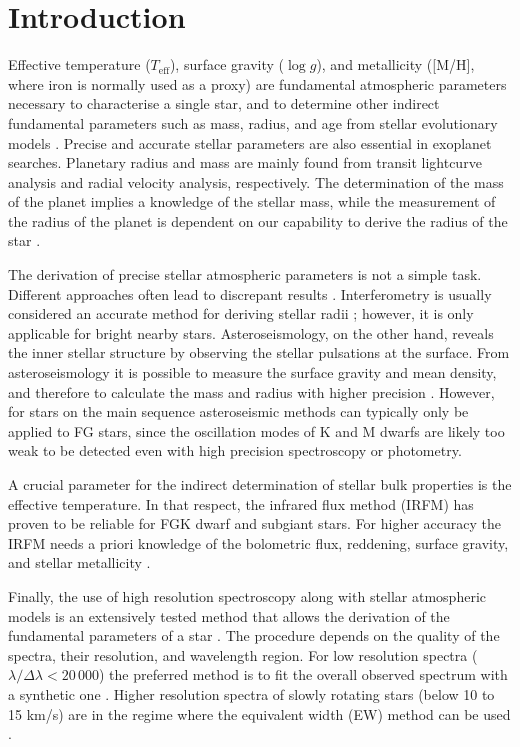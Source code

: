 \documentclass{aa}
\begin{document}
\section{Introduction}
\label{sec:introduction}

Effective temperature ($T_\mathrm{eff}$), surface gravity ($\log g$),
and metallicity ([M/H], where iron is normally used as a proxy)
are fundamental atmospheric parameters necessary to characterise a single
star, and to determine other indirect fundamental parameters
such as mass, radius, and age from stellar evolutionary models
\citep[see e.g.][]{Girardi2000,Dotter2008,Baraffe2015}.
Precise and accurate stellar parameters are also essential in
exoplanet searches. Planetary radius and mass are mainly found from
transit lightcurve analysis and radial velocity analysis, respectively. The
determination of the mass of the planet implies a knowledge of the
stellar mass, while the measurement of the radius of the planet
is dependent on our capability to derive the radius of the star
\citep[see e.g.][]{Torres2008,Ammler2009,Torres2012}.

The derivation of precise stellar atmospheric parameters is not a simple task.
Different approaches often lead to discrepant results
\citep[see e.g.][]{Santos13}. Interferometry is usually considered  an accurate
method for deriving stellar radii \citep[see e.g.][]{Boyajian2012}; however, it is
only applicable for bright nearby stars. Asteroseismology, on the other hand,
reveals the inner stellar structure by observing the stellar pulsations at the
surface. From asteroseismology it is possible to measure the surface gravity and
mean density, and therefore to calculate the mass and radius with higher
precision \citep[e.g.][]{Kjeldsen1995}. However, for stars on the main sequence
asteroseismic methods can typically only be applied to FG stars, since the
oscillation modes of K and M dwarfs are likely too weak to be detected even with
high precision spectroscopy or photometry.

A crucial parameter for the indirect determination of stellar bulk properties is
the effective temperature. In that respect, the infrared flux method (IRFM) has
proven to be reliable for FGK dwarf and subgiant stars. For higher accuracy the
IRFM needs a priori knowledge of the bolometric flux, reddening, surface
gravity, and stellar metallicity
\citep{Blackwell1977,Ramirez2005b,Casagrande2010}.

Finally, the use of high resolution spectroscopy along with stellar atmospheric
models is an extensively tested method that allows the derivation of the
fundamental parameters of a star \citep[see e.g.][]{Valenti2005,Santos13}. The
procedure depends on the quality of the spectra, their resolution, and
wavelength region. For low resolution spectra ($\lambda/\Delta\lambda <
20\,000$) the preferred method is to fit the overall observed spectrum with a
synthetic one \citep[see e.g.][]{Recio2006}. Higher resolution spectra of slowly
rotating stars (below 10 to 15 \si{km/s}) are in the regime where the
equivalent width (EW) method can be used
\citep[see e.g.][for details]{Andreasen2017a,Tsantaki2017}.
\end{document}
